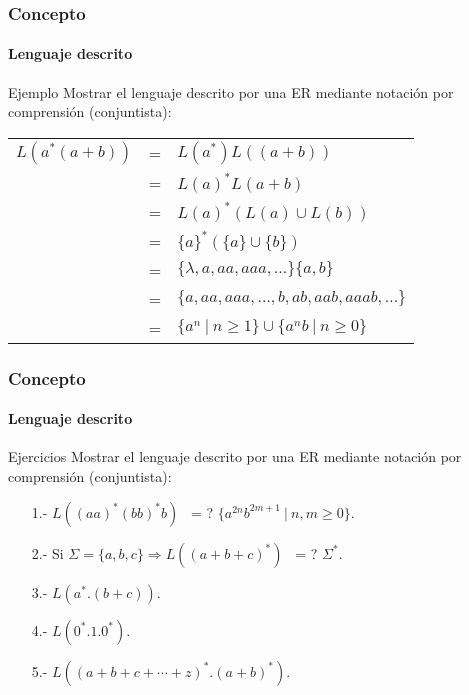 \documentclass{beamer}
\begin{document}
        \begin{frame}
			\frametitle{Concepto}
			\framesubtitle{Lenguaje descrito}

			\begin{exampleblock}{Ejemplo}
			    Mostrar el lenguaje descrito por una ER mediante notaci\'on por comprensi\'on (conjuntista):
			    \begin{table}[H]
			            \begin{center}
			                \begin{tabular}{rcl}
			                    $L(a^{*}(a+b))$ 
			                    & = & $L(a^{*})L((a+b))$ \\
			                    & = & $L(a)^{*}L(a+b)$ \\
			                    & = & $L(a)^{*}(L(a) \cup L(b))$ \\
			                    & = & $\{a\}^{*}(\{a\} \cup \{b\})$ \\
			                    & = & $\{\lambda,a,aa,aaa,\ldots\}\{a,b\}$ \\
			                    & = & $\{a,aa,aaa,\ldots,b,ab,aab,aaab,\ldots\}$ \\
			                    & = & $\{a^{n}~|~n \geq 1\} \cup \{a^{n}b~|~n \geq 0\}$ \\
			                \end{tabular}
			            \end{center}
			        \end{table}
			\end{exampleblock}
		\end{frame}

        \begin{frame}
			\frametitle{Concepto}
			\framesubtitle{Lenguaje descrito}

			\begin{exampleblock}{Ejercicios}
			    Mostrar el lenguaje descrito por una ER mediante notaci\'on por comprensi\'on (conjuntista):
			    \begin{itemize}
			        \item[1.-] $L((aa)^{*}(bb)^{*}b)$ \textquestiondown~= ? $\{a^{2n}b^{2m+1}~|~n,m \geq 0\}$.
			        \item[2.-] Si $\Sigma = \{a,b,c\} \Rightarrow L((a+b+c)^{*})$ \textquestiondown~= ? $\Sigma^{*}$.
			        \item[3.-] $L(a^{*}.(b+c))$.
			        \item[4.-] $L(0^{*}.1.0^{*})$.
			        \item[5.-] $L((a+b+c+\cdots+z)^{*}.(a+b)^{*})$.
			    \end{itemize}
			\end{exampleblock}
		\end{frame}
\end{document}

